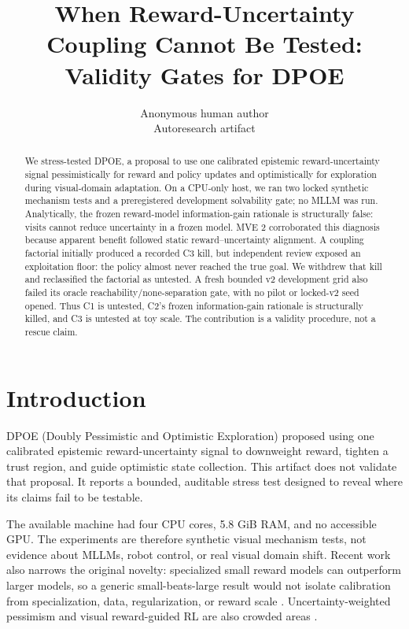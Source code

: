 \documentclass{article}
\title{When Reward-Uncertainty Coupling Cannot Be Tested: Validity Gates for DPOE}
\author{Anonymous human author\\Autoresearch artifact}
\begin{document}
\maketitle
\begin{abstract}
We stress-tested DPOE, a proposal to use one calibrated epistemic reward-uncertainty signal pessimistically for reward and policy updates and optimistically for exploration during visual-domain adaptation. On a CPU-only host, we ran two locked synthetic mechanism tests and a preregistered development solvability gate; no MLLM was run. Analytically, the frozen reward-model information-gain rationale is structurally false: visits cannot reduce uncertainty in a frozen model. MVE 2 corroborated this diagnosis because apparent benefit followed static reward--uncertainty alignment. A coupling factorial initially produced a recorded C3 kill, but independent review exposed an exploitation floor: the policy almost never reached the true goal. We withdrew that kill and reclassified the factorial as untested. A fresh bounded v2 development grid also failed its oracle reachability/none-separation gate, with no pilot or locked-v2 seed opened. Thus C1 is untested, C2's frozen information-gain rationale is structurally killed, and C3 is untested at toy scale. The contribution is a validity procedure, not a rescue claim.
\end{abstract}

\section{Introduction}
DPOE (Doubly Pessimistic and Optimistic Exploration) proposed using one calibrated epistemic reward-uncertainty signal to downweight reward, tighten a trust region, and guide optimistic state collection. This artifact does not validate that proposal. It reports a bounded, auditable stress test designed to reveal where its claims fail to be testable.

The available machine had four CPU cores, 5.8 GiB RAM, and no accessible GPU. The experiments are therefore synthetic visual mechanism tests, not evidence about MLLMs, robot control, or real visual domain shift. Recent work also narrows the original novelty: specialized small reward models can outperform larger models, so a generic small-beats-large result would not isolate calibration from specialization, data, regularization, or reward scale \citep{drivereward}. Uncertainty-weighted pessimism and visual reward-guided RL are also crowded areas \citep{hahami,vlmar3l,largereward}.
\end{document}
